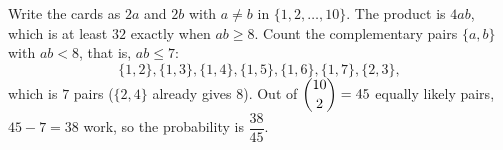 Write the cards as $2a$ and $2b$ with $a\ne b$ in $\{1,2,\dots,10\}$. The product is $4ab$, which is at least $32$ exactly when $ab\ge8$. Count the complementary pairs $\{a,b\}$ with $ab<8$, that is, $ab\le7$:
\[\{1,2\},\{1,3\},\{1,4\},\{1,5\},\{1,6\},\{1,7\},\{2,3\},\]
which is $7$ pairs ($\{2,4\}$ already gives $8$). Out of $\dbinom{10}{2}=45$ equally likely pairs, $45-7=38$ work, so the probability is $\boxed{\dfrac{38}{45}}$.
